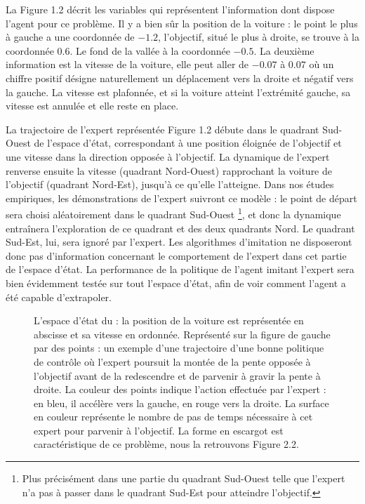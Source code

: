 \documentclass[frenchb,a4paper,justified,notoc]{tufte-book}
\begin{document}
La Figure 1.2 
décrit les variables qui représentent l'information dont dispose l'agent pour ce problème. Il y a bien sûr la position de la voiture : le point le plus à gauche a une coordonnée de $-1.2$, l'objectif, situé le plus à droite, se trouve à la coordonnée $0.6$. Le fond de la vallée à la coordonnée $-0.5$. La deuxième information est la vitesse de la voiture, elle peut aller de $-0.07$ à $0.07$ où un chiffre positif désigne naturellement un déplacement vers la droite et négatif vers la gauche. La vitesse est plafonnée, et si la voiture atteint l'extrémité gauche, sa vitesse est annulée et elle reste en place.

La trajectoire de l'expert représentée Figure 1.2 
débute dans le quadrant Sud-Ouest de l'espace d'état, correspondant à une position éloignée de l'objectif et une vitesse dans la direction opposée à l'objectif. La dynamique de l'expert renverse ensuite la vitesse (quadrant Nord-Ouest) rapprochant la voiture de l'objectif (quadrant Nord-Est), jusqu'à ce qu'elle l'atteigne. Dans nos études empiriques, les démonstrations de l'expert suivront ce modèle : le point de départ sera choisi aléatoirement dans le quadrant Sud-Ouest \footnote{Plus précisément dans une partie du quadrant Sud-Ouest telle que l'expert n'a pas à passer dans le quadrant Sud-Est pour atteindre l'objectif.
 }, et donc la dynamique entraînera l'exploration de ce quadrant et des deux quadrants Nord. Le quadrant Sud-Est, lui, sera ignoré par l'expert. Les algorithmes d'imitation ne disposeront donc pas d'information concernant le comportement de l'expert dans cet partie de l'espace d'état. La performance de la politique de l'agent imitant l'expert sera bien évidemment testée sur tout l'espace d'état, afin de voir comment l'agent a été capable d'extrapoler.
\begin{figure}
\begin{tikzpicture}[for this and nested ones={scale=.6},transform shape]

\end{tikzpicture} 
\caption[Espace d'état du ]{L'espace d'état du  : la position de la voiture est représentée en abscisse et sa vitesse en ordonnée. Représenté sur la figure de gauche par des points : un exemple d'une trajectoire d'une bonne politique de contrôle où l'expert poursuit la montée de la pente opposée à l'objectif avant de la redescendre et de parvenir à gravir la pente à droite. La couleur des points indique l'action effectuée par l'expert : en bleu, il accélère vers la gauche, en rouge vers la droite. La surface en couleur représente le nombre de pas de temps nécessaire à cet expert pour parvenir à l'objectif. La forme en escargot est caractéristique de ce problème, nous la retrouvons Figure 2.2.}
\label{fig:mcstatespace}
\end{figure}
\end{document}
